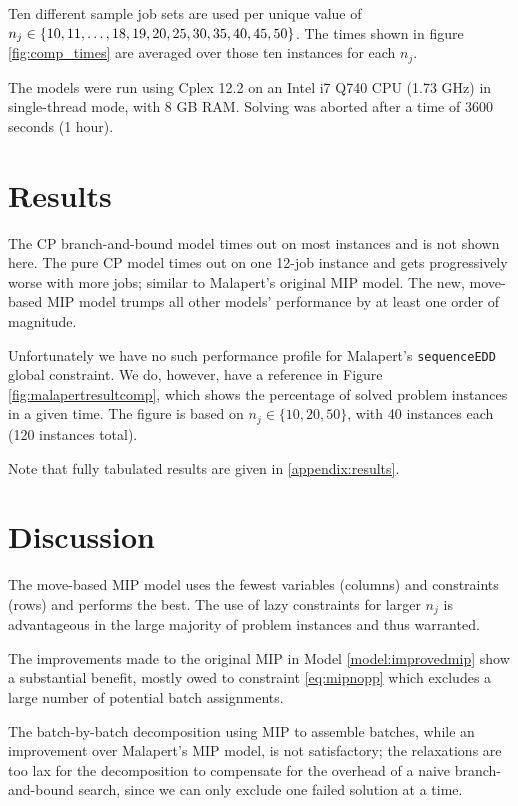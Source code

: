 \documentclass[13pt, letterpaper, oneside]{book}
\begin{document}
Ten different sample job sets are
used per unique value of $n_j \in \{10, 11, \dots, 18, 19, 20, 25,\\ 30, 35, 40, 45, 50\}$. The times shown in figure \ref{fig:comp_times}
are averaged over those ten instances for each $n_j$.

The models were run using Cplex 12.2 on an Intel i7 Q740 CPU (1.73 GHz) in single-thread mode, with 8 GB RAM.
Solving was aborted after a time of 3600 seconds (1 hour).

\section{Results}
\label{sec:results}
The CP branch-and-bound model times out on most instances and is not shown here.
The pure CP model times out on one 12-job instance and gets progressively worse
with more jobs; similar to Malapert's original MIP model.
 The new, move-based MIP model trumps all other
models' performance by at least one order of magnitude.

Unfortunately we have no such performance profile for Malapert's
\texttt{sequenceEDD} global constraint. We do, however, have a reference in
Figure \ref{fig:malapertresultcomp}, which shows the percentage of solved
problem instances in a given time. The figure is based on $n_j \in \{10, 20,
50\}$, with 40 instances each (120 instances total).


Note that fully tabulated results are given in \ref{appendix:results}.

\section{Discussion}\label{sec:discussion}
The move-based MIP model uses the fewest variables (columns) and
constraints (rows) and performs the best. The use of lazy constraints for
larger $n_j$ is advantageous in the large majority of problem instances and thus
warranted. 

The improvements made to the original MIP in Model \ref{model:improvedmip} show
a substantial benefit, mostly owed to constraint \eqref{eq:mipnopp} which
excludes a large number of potential batch assignments.

The batch-by-batch decomposition using MIP to assemble batches, while an
improvement over Malapert's MIP model, is not satisfactory; the relaxations are
too lax for the decomposition to compensate for the overhead of a naive
branch-and-bound search, since we can only exclude one failed solution at a
time.
\end{document}
